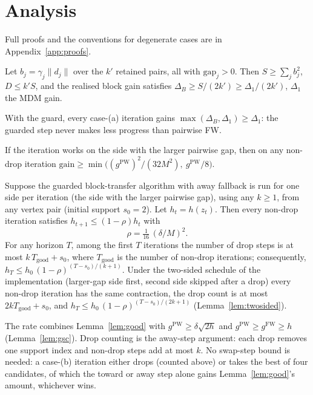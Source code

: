 \documentclass{opt2026}   %
\newcommand{\norm}[1]{\lVert #1 \rVert}
\newcommand{\gFW}{g^{\mathrm{FW}}}
\newcommand{\gPW}{g^{\mathrm{PW}}}
\begin{document}
\section{Analysis}\label{sec:theory}

Full proofs and the conventions for degenerate cases are in
Appendix~\ref{app:proofs}.

\begin{lemma}\label{lem:block}
Let $b_j=\gamma_j\norm{d_j}$ over the $k'$ retained pairs, all with
$\mathrm{gap}_j>0$. Then $S\ge\sum_jb_j^2$, $D\le k'S$, and
the realised block gain satisfies
$\Delta_B\ge S/(2k')\ge\Delta_1/(2k')$, $\Delta_1$ the MDM gain.
\end{lemma}
With the guard, every case-(a) iteration gains
$\max(\Delta_B,\Delta_1)\ge\Delta_1$: the guarded step never makes less
progress than pairwise FW.

\begin{lemma}\label{lem:good}
If the iteration works on the side with the larger pairwise gap, then
on any non-drop iteration $\mathrm{gain}\ge\min\!\big((\gPW)^2/(32M^2),\ \gPW/8\big)$.
\end{lemma}
\begin{theorem}\label{thm:linear}
Suppose the guarded block-transfer algorithm with away fallback is run
for one side per iteration (the side with the larger pairwise gap),
using any $k\ge1$, from any vertex pair (initial support $s_0=2$).
Let $h_t=h(z_t)$. Then every non-drop iteration satisfies
$h_{t+1}\le(1-\rho)h_t$ with
\[
\rho=\tfrac1{16}\,(\delta/M)^2 .
\]
For any horizon $T$, among the first $T$ iterations the number of drop
steps is at most
$k\,T_{\mathrm{good}}+s_0$, where $T_{\mathrm{good}}$ is the number of
non-drop iterations; consequently,
$h_T\le h_0\,(1-\rho)^{(T-s_0)/(k+1)}$. Under the two-sided
schedule of the implementation (larger-gap side first, second side
skipped after a drop) every non-drop iteration has the same
contraction, the drop count is at most $2kT_{\mathrm{good}}+s_0$, and
$h_T\le h_0\,(1-\rho)^{(T-s_0)/(2k+1)}$ (Lemma~\ref{lem:twosided}).
\end{theorem}
The rate combines Lemma~\ref{lem:good} with $\gPW\ge\delta\sqrt{2h}$
and $\gPW\ge\gFW\ge h$ (Lemma~\ref{lem:gsc}). Drop counting is the away-step argument: each
drop removes one support index and non-drop steps add at most $k$.
No swap-step bound is needed: a case-(b) iteration either drops
(counted above) or takes the best of four candidates, of which the
toward or away step alone gains Lemma~\ref{lem:good}'s amount,
whichever wins.
\end{document}
